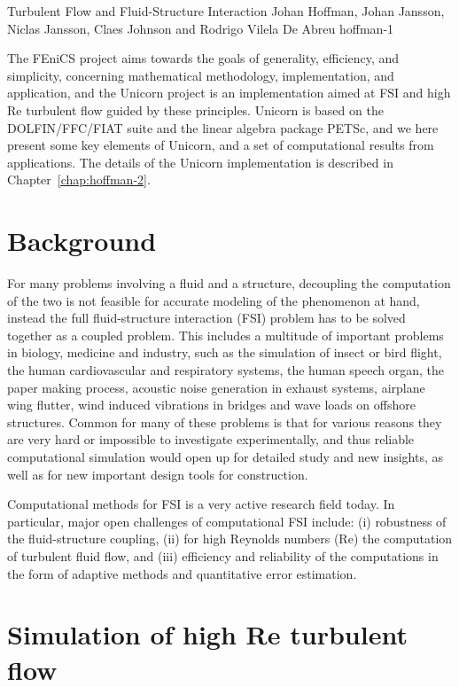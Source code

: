               {Turbulent Flow and Fluid-Structure Interaction}
              {Johan Hoffman, Johan Jansson, Niclas Jansson, Claes Johnson and Rodrigo Vilela De Abreu}
              {hoffman-1}

The FEniCS project aims towards the goals of
generality, efficiency, and simplicity, concerning
mathematical methodology, implementation, and
application, and the Unicorn project is an
implementation aimed at FSI and high Re turbulent flow
guided by these principles. Unicorn is based on the
DOLFIN/FFC/FIAT suite and the linear algebra package
PETSc, and we here present some key elements of
Unicorn, and a set of computational results from
applications. The details of the Unicorn
implementation is described in
Chapter~\ref{chap:hoffman-2}.

\section{Background}

For many problems involving a fluid and a structure,
decoupling the computation of the two is not feasible
for accurate modeling of the phenomenon at hand,
instead the full fluid-structure interaction (FSI)
problem has to be solved together as a coupled
problem. This includes a multitude of important
problems in biology, medicine and industry, such as
the simulation of insect or bird flight, the human
cardiovascular and respiratory systems, the human
speech organ, the paper making process, acoustic noise
generation in exhaust systems, airplane wing flutter,
wind induced vibrations in bridges and wave loads on
offshore structures. Common for many of these problems
is that for various reasons they are very hard or
impossible to investigate experimentally, and thus
reliable computational simulation would open up for
detailed study and new insights, as well as for new
important design tools for construction.

Computational methods for FSI is a very active
research field today. In particular, major open
challenges of computational FSI include: (i)
robustness of the fluid-structure coupling, (ii) for
high Reynolds numbers (Re) the computation of
turbulent fluid flow, and (iii) efficiency and
reliability of the computations in the form of
adaptive methods and quantitative error estimation.

\section{Simulation of high Re turbulent flow}

